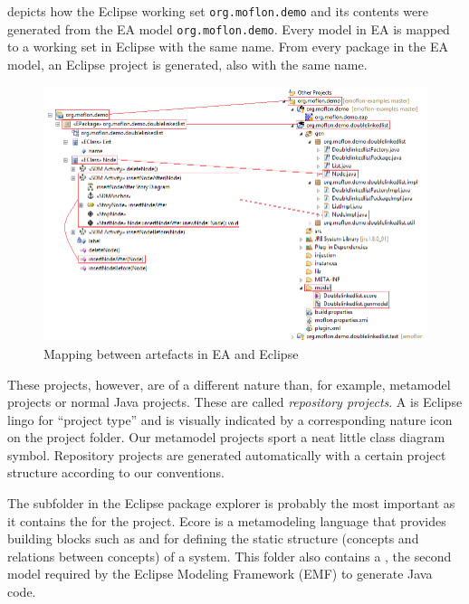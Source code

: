  depicts how the Eclipse working set \texttt{org.moflon.demo} and its contents were generated from the EA model \texttt{org.moflon.demo}. Every model
in EA is mapped to a working set in Eclipse with the same name. From every package in the EA model, an Eclipse project is generated, also with the same name.

\begin{figure}[htbp]
    \centering
  \includegraphics[width=\textwidth]{../../org.moflon.doc.handbook.01_installation/4_projectSetup/modelingWithEA/ea_images/fromEAToEclipse}
    \caption{Mapping between artefacts in EA and Eclipse}
    \label{fig:fromEAtoEclipse}
\end{figure}

These projects, however, are of a different nature than, for example, metamodel projects or normal Java projects.
These are called \emph{repository projects}.
A  is Eclipse lingo for \enquote{project type} and is visually indicated by a corresponding nature icon on the project folder.
Our metamodel projects sport a neat little class diagram symbol.
Repository projects are generated automatically with a certain project structure according to our conventions.

The  subfolder in the Eclipse package explorer is probably the most important as it contains the  for the project. Ecore is a metamodeling language that provides building blocks such as  and  for defining the static structure (concepts and relations between concepts) of a system.
This folder also contains a , the second model required by the Eclipse Modeling Framework (EMF) to generate Java code.

